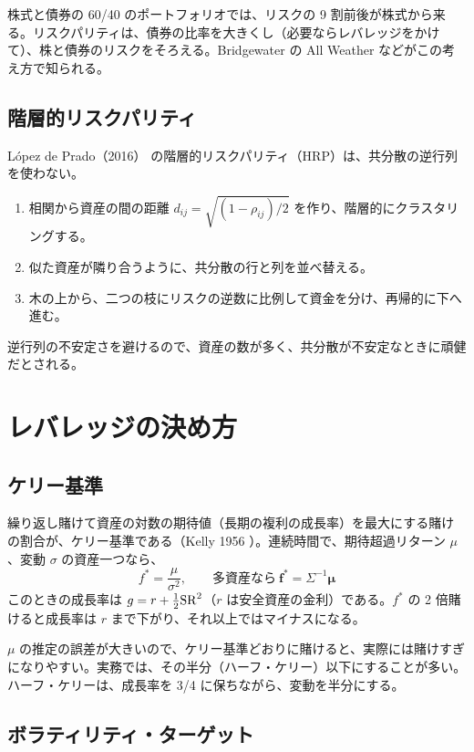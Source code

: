 株式と債券の 60/40 のポートフォリオでは、リスクの 9 割前後が株式から来る。リスクパリティは、債券の比率を大きくし（必要ならレバレッジをかけて）、株と債券のリスクをそろえる。Bridgewater の All Weather などがこの考え方で知られる。

\subsection{階層的リスクパリティ}

López de Prado（2016）\cite{hrp2016} の階層的リスクパリティ（HRP）は、共分散の逆行列を使わない。
\begin{enumerate}
\item 相関から資産の間の距離 $d_{ij} = \sqrt{(1-\rho_{ij})/2}$ を作り、階層的にクラスタリングする。
\item 似た資産が隣り合うように、共分散の行と列を並べ替える。
\item 木の上から、二つの枝にリスクの逆数に比例して資金を分け、再帰的に下へ進む。
\end{enumerate}
逆行列の不安定さを避けるので、資産の数が多く、共分散が不安定なときに頑健だとされる。

\section{レバレッジの決め方}

\subsection{ケリー基準}

繰り返し賭けて資産の対数の期待値（長期の複利の成長率）を最大にする賭けの割合が、ケリー基準である（Kelly 1956 \cite{kelly1956}）。連続時間で、期待超過リターン $\mu$、変動 $\sigma$ の資産一つなら、
\begin{equation}
f^* = \frac{\mu}{\sigma^2}, \qquad \text{多資産なら}\ \bm f^* = \Sigma^{-1}\bm\mu
\end{equation}
このときの成長率は $g = r + \frac{1}{2}\mathrm{SR}^2$（$r$ は安全資産の金利）である。$f^*$ の 2 倍賭けると成長率は $r$ まで下がり、それ以上ではマイナスになる。

$\mu$ の推定の誤差が大きいので、ケリー基準どおりに賭けると、実際には賭けすぎになりやすい。実務では、その半分（ハーフ・ケリー）以下にすることが多い。ハーフ・ケリーは、成長率を 3/4 に保ちながら、変動を半分にする。

\subsection{ボラティリティ・ターゲット}

